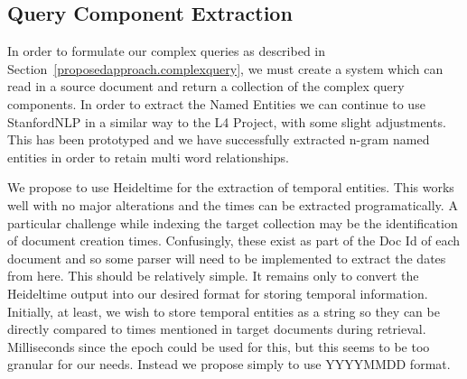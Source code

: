 \documentclass{mprop}
\begin{document}

\subsection{Query Component Extraction}
In order to formulate our complex queries as described in Section~\ref{proposedapproach.complexquery}, we must create a system which can read in a source document and return a collection of the complex query components. 
In order to extract the Named Entities we can continue to use StanfordNLP in a similar way to the L4 Project, with some slight adjustments.
This has been prototyped and we have successfully extracted n-gram named entities in order to retain multi word relationships.

We propose to use Heideltime for the extraction of temporal entities.
This works well with no major alterations and the times can be extracted programatically.
A particular challenge while indexing the target collection may be the identification of document creation times.
Confusingly, these exist as part of the Doc Id of each document and so some parser will need to be implemented to extract the dates from here.
This should be relatively simple.
It remains only to convert the Heideltime output into our desired format for storing temporal information.
Initially, at least, we wish to store temporal entities as a string so they can be directly compared to times mentioned in target documents during retrieval.
Milliseconds since the epoch could be used for this, but this seems to be too granular for our needs.
Instead we propose simply to use YYYYMMDD format.
\end{document}
